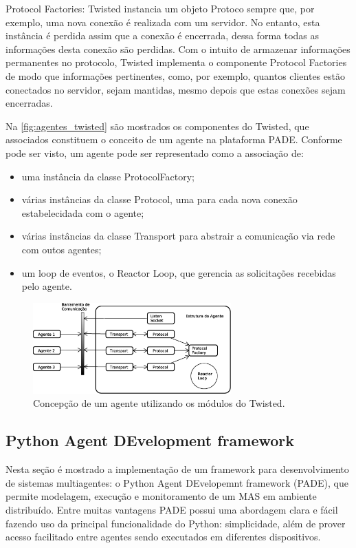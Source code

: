 \documentclass[journal]{IEEEtran}
\begin{document}
Protocol Factories: Twisted instancia um objeto Protoco sempre que, por exemplo, uma nova conexão é realizada com um servidor. No entanto, esta instância é perdida assim que a conexão é encerrada, dessa forma todas as informações desta conexão são perdidas. Com o intuito de armazenar informações permanentes no protocolo, Twisted implementa o componente Protocol Factories de modo que informações pertinentes, como, por exemplo, quantos clientes estão conectados no servidor, sejam mantidas, mesmo depois que estas conexões sejam encerradas.

Na \autoref{fig:agentes_twisted} são mostrados os componentes do Twisted, que associados constituem o conceito de um agente na plataforma PADE. Conforme pode ser visto, um agente pode ser representado como a associação de:
\begin{itemize}
  \item uma instância da classe ProtocolFactory;
  \item várias instâncias da classe Protocol, uma para cada nova conexão estabelecidada com o agente;
  \item várias instâncias da classe Transport para abstrair a comunicação via rede com outos agentes;
  \item um loop de eventos, o Reactor Loop, que gerencia as solicitações recebidas pelo agente.
\end{itemize}

\begin{figure}[htb]
    \centering
    \includegraphics[width=3.0in]{Figuras/agente_twisted.eps}
    
    \caption{\label{fig:agentes_twisted} Concepção de um agente utilizando os módulos do Twisted.}
\end{figure}

\subsection{Python Agent DEvelopment framework}

Nesta seção é mostrado a implementação de um framework para desenvolvimento de sistemas multiagentes: o Python Agent DEvelopemnt framework (PADE), que permite modelagem, execução e monitoramento de um MAS em ambiente distribuído. Entre muitas vantagens PADE possui uma abordagem clara e fácil fazendo uso da principal funcionalidade do Python: simplicidade, além de prover acesso facilitado entre agentes sendo executados em diferentes dispositivos.
\end{document}
